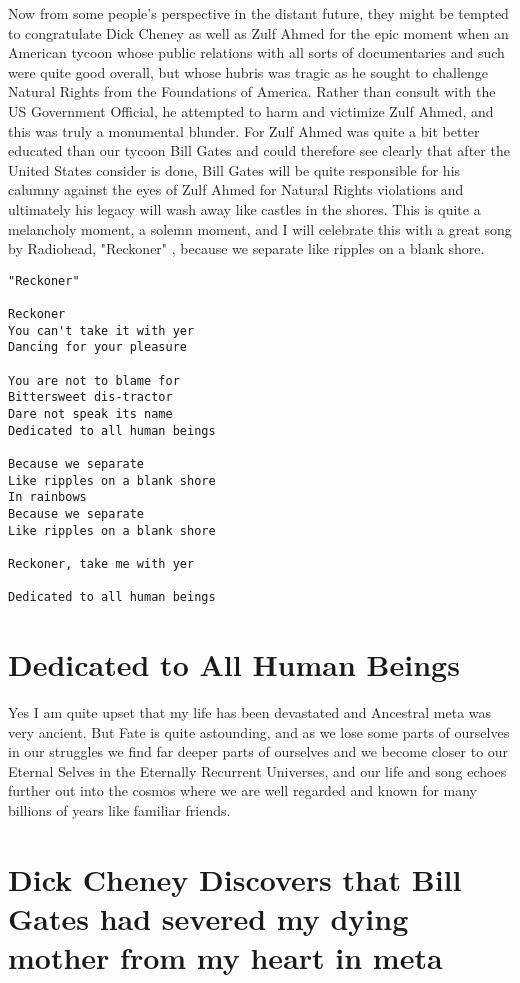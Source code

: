 \documentclass{amsart}
\begin{document}
Now from some people's perspective in the distant future, they might be tempted to congratulate Dick Cheney as well as Zulf Ahmed for the epic moment when an American tycoon whose public relations with all sorts of documentaries and such were quite good overall, but whose hubris was tragic as he sought to challenge Natural Rights from the Foundations of America.  Rather than consult with the US Government Official, he attempted to harm and victimize Zulf Ahmed, and this was truly a monumental blunder.  For Zulf Ahmed was quite a bit better educated than our tycoon Bill Gates and could therefore see clearly that after the United States consider is done, Bill Gates will be quite responsible for his calumny against the eyes of Zulf Ahmed for Natural Rights violations and ultimately his legacy will wash away like castles in the shores.  This is quite a melancholy moment, a solemn moment, and I will celebrate this with a great song by Radiohead, "Reckoner" \cite{RR}, because we separate like ripples on a blank shore.

\begin{verbatim}
"Reckoner"

Reckoner
You can't take it with yer
Dancing for your pleasure

You are not to blame for
Bittersweet dis-tractor
Dare not speak its name
Dedicated to all human beings

Because we separate
Like ripples on a blank shore
In rainbows
Because we separate
Like ripples on a blank shore

Reckoner, take me with yer

Dedicated to all human beings
\end{verbatim}


\section{Dedicated to All Human Beings}
Yes I am quite upset that my life has been devastated and Ancestral meta was very ancient.  But Fate is quite astounding, and as we lose some parts of ourselves in our struggles we find far deeper parts of ourselves and we become closer to our Eternal Selves in the Eternally Recurrent Universes, and our life and song echoes further out into the cosmos where we are well regarded and known for many billions of years like familiar friends.

\section{Dick Cheney Discovers that Bill Gates had severed my dying mother from my heart in meta}
\end{document}
